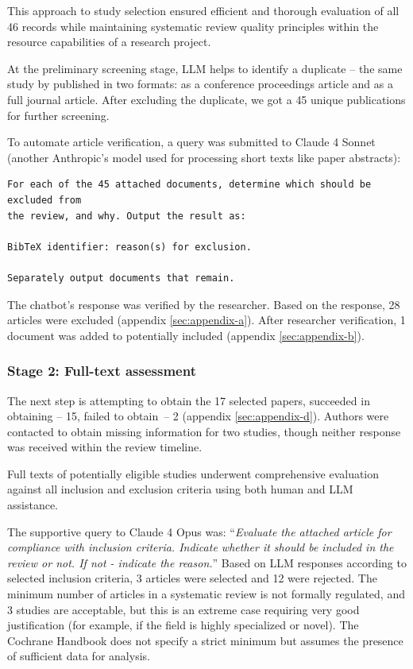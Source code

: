 \documentclass[
hf,
]{ceurart}
\begin{document}
This approach to study selection ensured efficient and thorough evaluation of all 46 records while maintaining systematic review quality principles within the resource capabilities of a research project.

At the preliminary screening stage, LLM helps to identify a duplicate --  the same study by  \cite{Shiue2017460} published in two formats: as a conference proceedings article and as a full journal article. After excluding the duplicate, we got a {45 unique publications} for further screening.

To automate article verification, a query was submitted to Claude 4 Sonnet (another Anthropic's model used for processing short texts like paper abstracts):

\begin{verbatim}
For each of the 45 attached documents, determine which should be excluded from 
the review, and why. Output the result as:

BibTeX identifier: reason(s) for exclusion.

Separately output documents that remain.
\end{verbatim}

The chatbot's response was verified by the researcher. Based on the response, 28 articles were excluded (appendix \ref{sec:appendix-a}). After researcher verification, 1 document was added to potentially included (appendix \ref{sec:appendix-b}). 


\subsubsection{Stage 2: Full-text assessment}

The next step is attempting to obtain the 17 selected papers, succeeded in obtaining -- 15, failed to obtain~-- 2 (appendix \ref{sec:appendix-d}). Authors were contacted to obtain missing information for two studies, though neither response was received within the review timeline.

Full texts of potentially eligible studies underwent comprehensive evaluation against all inclusion and exclusion criteria using both human and LLM assistance. %

The supportive query to Claude 4 Opus was: ``\textit{Evaluate the attached article for compliance with inclusion criteria. Indicate whether it should be included in the review or not. If not - indicate the reason.}''  Based on LLM responses according to selected inclusion criteria, 3 articles were selected and 12 were rejected. The minimum number of articles in a systematic review is not formally regulated, and 3 studies are acceptable, but this is an extreme case requiring very good justification (for example, if the field is highly specialized or novel). The Cochrane Handbook does not specify a strict minimum but assumes the presence of sufficient data for analysis.
\end{document}
